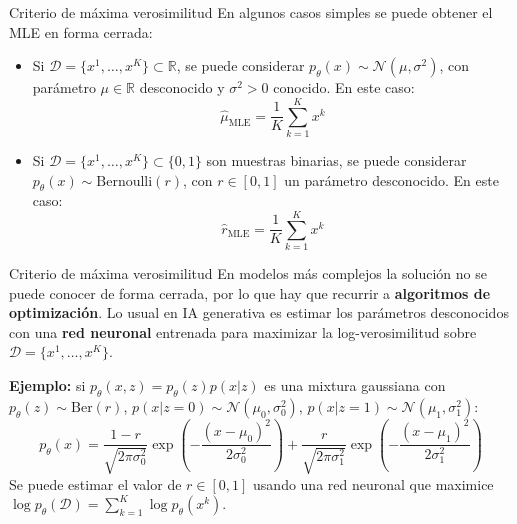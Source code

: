 \documentclass{beamer}
\newcommand{\R}{\mathbb{R}}
\begin{document}
\begin{frame}{Criterio de máxima verosimilitud}
    En algunos casos simples se puede obtener el MLE en forma cerrada:
    \begin{itemize}
        \item Si $\mathcal{D}=\{x^1,\ldots,x^K\}\subset\R$, se puede considerar $p_\theta(x)\sim\mathcal{N}(\mu,\sigma^2)$, con parámetro $\mu\in\R$ desconocido y $\sigma^2>0$ conocido. En este caso:
              \begin{equation*}
                  \hat\mu_\text{MLE}=\frac{1}{K}\sum_{k=1}^K x^k
              \end{equation*}
        \item Si $\mathcal{D}=\{x^1,\ldots,x^K\}\subset\{0,1\}$ son muestras binarias, se puede considerar $p_\theta(x)\sim\text{Bernoulli}(r)$, con $r\in[0,1]$ un parámetro desconocido. En este caso:
              \begin{equation*}
                  \hat r_\text{MLE}=\frac{1}{K}\sum_{k=1}^K x^k
              \end{equation*}
    \end{itemize}
\end{frame}

\begin{frame}{Criterio de máxima verosimilitud}
    En modelos más complejos la solución no se puede conocer de forma cerrada, por lo que hay que recurrir a \textbf{algoritmos de optimización}. Lo usual en IA generativa es estimar los parámetros desconocidos con una \textbf{red neuronal} entrenada para maximizar la log-verosimilitud sobre $\mathcal{D}=\{x^1,\ldots,x^K\}$.

    \textbf{Ejemplo:} si $p_\theta(x,z)=p_\theta(z)p(x|z)$ es una mixtura gaussiana con $p_\theta(z)\sim\text{Ber}(r)$, $p(x|z=0)\sim\mathcal{N}(\mu_0,\sigma_0^2)$, $p(x|z=1)\sim\mathcal{N}(\mu_1,\sigma_1^2)$:
    \begin{equation*}
        p_\theta(x)=\frac{1-r}{\sqrt{2\pi\sigma_0^2}}\exp\left(-\frac{(x-\mu_0)^2}{2\sigma_0^2}\right) + \frac{r}{\sqrt{2\pi\sigma_1^2}}\exp\left(-\frac{(x-\mu_1)^2}{2\sigma_1^2}\right)
    \end{equation*}
    Se puede estimar el valor de $r\in[0,1]$ usando una red neuronal que maximice $ \log p_\theta(\mathcal{D})=\sum_{k=1}^K \log p_\theta(x^k)$.
\end{frame}
\end{document}
